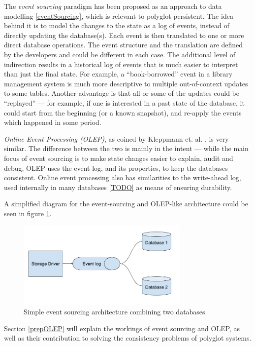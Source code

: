 \documentclass[12pt]{article}
\begin{document}
The \textit{event sourcing} paradigm has been proposed as an approach to data modelling \ref{eventSourcing}, which is relevant to polyglot persistent. The idea behind it is to model the changes to the state as a log of events, instead of directly updating the database(s). Each event is then translated to one or more direct database operations. The event structure and the translation are defined by the developers and could be different in each case. The additional level of indirection results in a historical log of events that is much easier to interpret than just the final state. For example, a ``book-borrowed'' event in a library management system is much more descriptive to multiple out-of-context updates to some tables. Another advantage is that all or some of the updates could be ``replayed'' --- for example, if one is interested in a past state of the database, it could start from the beginning (or a known snapshot), and re-apply the events which happened in some period.

\textit{Online Event Processing (OLEP)}, as coined by Kleppmann et. al. \cite{OLEP}, is very similar. The difference between the two is mainly in the intent --- while the main focus of event sourcing is to make state changes easier to explain, audit and debug, OLEP uses the event log, and its properties, to keep the databases consistent. Online event processing also has similarities to the write-ahead log, used internally in many databases \ref{TODO} as means of ensuring durability.

A simplified diagram for the event-sourcing and OLEP-like architecture could be seen in figure \ref{figEventSourcingPolyglot}.

\begin{figure}[h]
    \caption{Simple event sourcing architecture combining two databases}
    \centering
    \label{figEventSourcingPolyglot}
    \includegraphics[width=0.75\textwidth]{simple_event_sourcing.png}
\end{figure}

Section \ref{prepOLEP} will explain the workings of event sourcing and OLEP, as well as their contribution to solving the consistency problems of polyglot systems.
\end{document}
